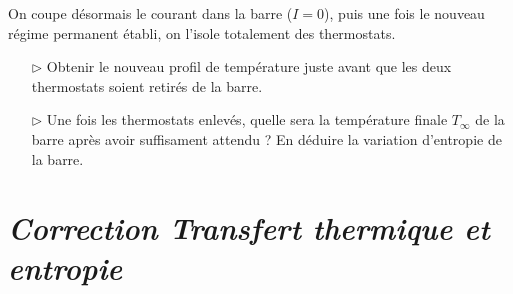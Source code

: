 \documentclass{report}
\begin{document}
On coupe désormais le courant dans la barre ($I=0$), puis une fois le nouveau régime permanent établi, on l'isole totalement des thermostats.

\begin{itemize}
		
	\item[$\triangleright$] Obtenir le nouveau profil de température juste avant que les deux thermostats soient retirés de la barre.
	
	\item[$\triangleright$] Une fois les thermostats enlevés, quelle sera la température finale $T_\infty$ de la barre après avoir suffisament attendu ? En déduire la variation d'entropie de la barre.
	
\end{itemize}

\newpage

\section*{\textit{Correction Transfert thermique et entropie}}
\end{document}
